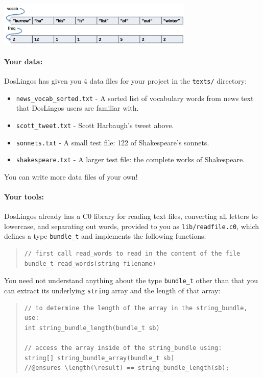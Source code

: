 \documentclass[12pt]{exam}
\begin{document}
\begin{center}
\includegraphics[width=0.7\textwidth]{img/array-after.png}
\end{center}

\paragraph{Your data:} DosLingos has given you 4 data files for your project
in the \lstinline'texts/' directory:
\begin{itemize}
\item \lstinline"news_vocab_sorted.txt" - A sorted list of vocabulary words from news text that DosLingos users are familiar with.
\item \lstinline"scott_tweet.txt" - Scott Harbaugh's tweet above.
\item \lstinline"sonnets.txt" - A small test file: 122 of Shakespeare's sonnets.
\item \lstinline"shakespeare.txt" - A larger test file: the complete works
  of Shakespeare.
\end{itemize}
You can write more data files of your own!

\paragraph{Your tools:}

DosLingos already has a C0 library for reading text files,
converting all letters to lowercase, and separating out words,
provided to you as \lstinline"lib/readfile.c0", which defines a type
\lstinline'bundle_t' and implements the following functions:

\begin{quote}
\begin{lstlisting}[numbers=none]
// first call read_words to read in the content of the file
bundle_t read_words(string filename)
\end{lstlisting}
\end{quote}
You need not understand anything about the type \lstinline"bundle_t"
other than that you can
extract its underlying \lstinline"string" array and the length of that array:
\begin{quote}
\begin{lstlisting}[numbers=none]
// to determine the length of the array in the string_bundle, use:
int string_bundle_length(bundle_t sb)

// access the array inside of the string_bundle using:
string[] string_bundle_array(bundle_t sb)
//@ensures \length(\result) == string_bundle_length(sb);
\end{lstlisting}
\end{quote}
\end{document}
